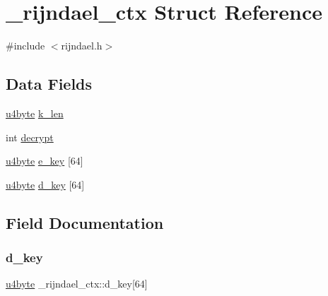 \hypertarget{struct__rijndael__ctx}{}\section{\+\_\+rijndael\+\_\+ctx Struct Reference}
\label{struct__rijndael__ctx}


{\ttfamily \#include $<$rijndael.\+h$>$}

\subsection*{Data Fields}
\begin{DoxyCompactItemize}
\item 
\mbox{\hyperlink{rijndael_8h_ac8cc4300c208ce4fbe50bd192acd6c9e}{u4byte}} \mbox{\hyperlink{struct__rijndael__ctx_ac3595b891818be236ee4cbf50995b8af}{k\+\_\+len}}
\item 
int \mbox{\hyperlink{struct__rijndael__ctx_aa07afd8353126ce5e938b42ceaff42b7}{decrypt}}
\item 
\mbox{\hyperlink{rijndael_8h_ac8cc4300c208ce4fbe50bd192acd6c9e}{u4byte}} \mbox{\hyperlink{struct__rijndael__ctx_abc54a82997fe467b97400f22d9b4d7dc}{e\+\_\+key}} \mbox{[}64\mbox{]}
\item 
\mbox{\hyperlink{rijndael_8h_ac8cc4300c208ce4fbe50bd192acd6c9e}{u4byte}} \mbox{\hyperlink{struct__rijndael__ctx_a45e6be46127c0bb68886cd4c0c725dc6}{d\+\_\+key}} \mbox{[}64\mbox{]}
\end{DoxyCompactItemize}


\subsection{Field Documentation}
\mbox{\label{struct__rijndael__ctx_a45e6be46127c0bb68886cd4c0c725dc6}} 
\subsubsection{\texorpdfstring{d\+\_\+key}{d\_key}}
{\footnotesize\ttfamily \mbox{\hyperlink{rijndael_8h_ac8cc4300c208ce4fbe50bd192acd6c9e}{u4byte}} \+\_\+rijndael\+\_\+ctx\+::d\+\_\+key\mbox{[}64\mbox{]}}

\mbox{\label{struct__rijndael__ctx_aa07afd8353126ce5e938b42ceaff42b7}} 
